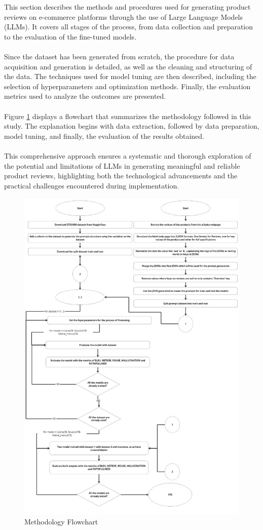 This section describes the methods and procedures used for generating product reviews on e-commerce platforms through the use of Large Language Models (LLMs). It covers all stages of the process, from data collection and preparation to the evaluation of the fine-tuned models.
\\\\
Since the dataset has been generated from scratch, the procedure for data acquisition and generation is detailed, as well as the cleaning and structuring of the data. The techniques used for model tuning are then described, including the selection of hyperparameters and optimization methods. Finally, the evaluation metrics used to analyze the outcomes are presented.
\\\\
Figure \ref{fig:MethodologyFlowchart} displays a flowchart that summarizes the methodology followed in this study. The explanation begins with data extraction, followed by data preparation, model tuning, and finally, the evaluation of the results obtained.
\\\\
This comprehensive approach ensures a systematic and thorough exploration of the potential and limitations of LLMs in generating meaningful and reliable product reviews, highlighting both the technological advancements and the practical challenges encountered during implementation.
\begin{figure}[H]
    \centering
    \includegraphics[width=13cm]{images/Methodology.jpg}
    \caption{Methodology Flowchart}
    \label{fig:MethodologyFlowchart}
\end{figure}
